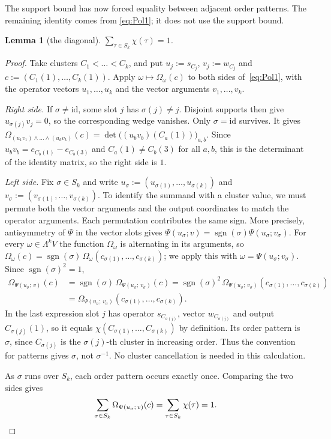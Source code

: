 \documentclass[11pt]{amsart}
\newtheorem{lemma}[theorem]{Lemma}
\theoremstyle{definition}
\theoremstyle{remark}
\numberwithin{equation}{section}
\newcommand{\sgn}{\operatorname{sgn}}
\newcommand{\id}{\mathrm{id}}
\theoremstyle{plain}
\theoremstyle{definition}
\theoremstyle{plain}
\begin{document}
The support bound has now forced equality between adjacent order patterns. The remaining identity comes from
\eqref{eq:Pol1}; it does not use the support bound.

\begin{lemma}[the diagonal]\label{lem:D}
$\sum_{\tau\in S_k}\chi(\tau)=1$.
\end{lemma}

\begin{proof}
Take clusters $C_1<\dots<C_k$, and put $u_j:=s_{C_j}$, $v_j:=w_{C_j}$ and
$c:=(C_1(1),\dots,C_k(1))$. Apply $\omega\mapsto\Omega_\omega(c)$ to both sides of~\eqref{eq:Pol1}, with the operator
vectors $u_1,\dots,u_k$ and the vector arguments $v_1,\dots,v_k$.

\emph{Right side.} If $\sigma\ne\id$, some slot $j$ has $\sigma(j)\ne j$. Disjoint supports then give
$u_{\sigma(j)}v_j=0$, so the corresponding wedge vanishes. Only $\sigma=\id$ survives. It gives $\Omega_{(u_1v_1)\wedge\dots\wedge(u_kv_k)}(c)=\det\bigl((u_bv_b)(C_a(1))\bigr)_{a,b}$. Since
$u_bv_b=e_{C_b(1)}-e_{C_b(3)}$ and $C_a(1)\ne C_b(3)$ for all $a,b$, this is the determinant of the identity matrix, so
the right side is $1$.

\emph{Left side.} Fix $\sigma\in S_k$ and write $u_\sigma:=(u_{\sigma(1)},\dots,u_{\sigma(k)})$ and
$v_\sigma:=(v_{\sigma(1)},\dots,v_{\sigma(k)})$. To identify the summand with a cluster value, we must permute both the
vector arguments and the output coordinates to match the operator arguments. Each permutation contributes the same
sign. More precisely, antisymmetry of $\Psi$ in the vector slots gives
$\Psi(u_\sigma;v)=\sgn(\sigma)\Psi(u_\sigma;v_\sigma)$. For every $\omega\in\Lambda^kV$ the function $\Omega_\omega$ is
alternating in its arguments, so $\Omega_\omega(c)=\sgn(\sigma)\,\Omega_\omega(c_{\sigma(1)},\dots,c_{\sigma(k)})$; we
apply this with $\omega=\Psi(u_\sigma;v_\sigma)$. Since $\sgn(\sigma)^2=1$,
\begin{align*}
\Omega_{\Psi(u_\sigma;\,v)}(c)&=\sgn(\sigma)\,\Omega_{\Psi(u_\sigma;\,v_\sigma)}(c)
=\sgn(\sigma)^2\,\Omega_{\Psi(u_\sigma;\,v_\sigma)}(c_{\sigma(1)},\dots,c_{\sigma(k)})\\
&=\Omega_{\Psi(u_\sigma;\,v_\sigma)}(c_{\sigma(1)},\dots,c_{\sigma(k)}).
\end{align*}
In the last expression slot $j$ has operator $s_{C_{\sigma(j)}}$, vector $w_{C_{\sigma(j)}}$ and output
$C_{\sigma(j)}(1)$, so it equals $\chi(C_{\sigma(1)},\dots,C_{\sigma(k)})$ by definition. Its order pattern is $\sigma$,
since $C_{\sigma(j)}$ is the $\sigma(j)$\nobreakdash-th cluster in increasing order. Thus the convention for patterns
gives $\sigma$, not $\sigma^{-1}$. No cluster cancellation is needed in this calculation.

As $\sigma$ runs over $S_k$, each order pattern occurs exactly once. Comparing the two sides gives
\[
\sum_{\sigma\in S_k}\Omega_{\Psi(u_\sigma;\,v)}(c)=\sum_{\tau\in S_k}\chi(\tau)=1 .\qedhere
\]
\end{proof}
\end{document}
